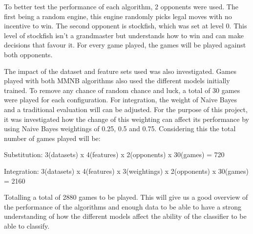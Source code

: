 To better test the performance of each algorithm, 2 opponents were used. The first being a random engine, this engine randomly picks legal moves with no incentive to win. The second opponent is stockfish, which was set at level 0. This level of stockfish isn't a grandmaster but understands how to win and can make decisions that favour it. For every game played, the games will be played against both opponents.

The impact of the dataset and feature sets used was also investigated. Games played with both MMNB algorithms also used the different models initially trained. To remove any chance of random chance and luck, a total of 30 games were played for each configuration. For integration, the weight of Naive Bayes and a traditional evaluation will can be adjusted. For the purpose of this project, it was investigated how the change of this weighting can affect its performance by using Naive Bayes weightings of 0.25, 0.5 and 0.75. Considering this the total number of games played will be:

Substitution: 3(datasets) x 4(features) x 2(opponents) x 30(games) = 720

Integration: 3(datasets) x 4(features) x 3(weightings) x 2(opponents) x 30(games) = 2160

Totalling a total of 2880 games to be played. This will give us a good overview of the performance of the algorithms and enough data to be able to have a strong understanding of how the different models affect the ability of the classifier to be able to classify. 






